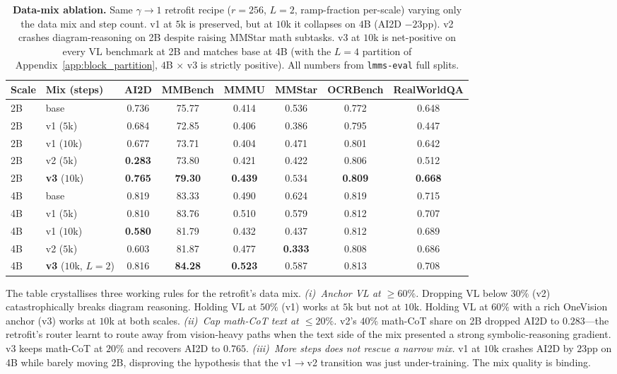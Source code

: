\documentclass{article}
\begin{document}
\begin{table}[h]
\caption{\textbf{Data-mix ablation.} Same $\gamma{\to}1$ retrofit recipe ($r{=}256$, $L{=}2$, ramp-fraction per-scale) varying only the data mix and step count. v1 at $5$k is preserved, but at $10$k it collapses on $4$B (AI2D $-23$pp). v2 crashes diagram-reasoning on 2B despite raising MMStar math subtasks. v3 at $10$k is net-positive on every VL benchmark at 2B and matches base at 4B (with the $L{=}4$ partition of Appendix~\ref{app:block_partition}, $4$B $\times$ v3 is strictly positive). All numbers from \texttt{lmms-eval} full splits.}
\label{tab:data_mix_ablation}
\centering\small
\setlength{\tabcolsep}{4pt}
\begin{tabular}{llcccccc}
\toprule
Scale & Mix (steps) & AI2D & MMBench & MMMU & MMStar & OCRBench & RealWorldQA \\
\midrule
2B & base                  & 0.736 & 75.77 & 0.414 & 0.536 & 0.772 & 0.648 \\
2B & v1 ($5$k)             & 0.684 & 72.85 & 0.406 & 0.386 & 0.795 & 0.447 \\
2B & v1 ($10$k)            & 0.677 & 73.71 & 0.404 & 0.471 & 0.801 & 0.642 \\
2B & v2 ($5$k)             & \textbf{0.283} & 73.80 & 0.421 & 0.422 & 0.806 & 0.512 \\
2B & \textbf{v3} ($10$k)   & \textbf{0.765} & \textbf{79.30} & \textbf{0.439} & $0.534$ & \textbf{0.809} & \textbf{0.668} \\
\midrule
4B & base                  & 0.819 & 83.33 & 0.490 & 0.624 & 0.819 & 0.715 \\
4B & v1 ($5$k)             & 0.810 & 83.76 & 0.510 & 0.579 & 0.812 & 0.707 \\
4B & v1 ($10$k)            & \textbf{0.580} & 81.79 & 0.432 & 0.437 & 0.812 & 0.689 \\
4B & v2 ($5$k)             & 0.603 & 81.87 & 0.477 & \textbf{0.333} & 0.808 & 0.686 \\
4B & \textbf{v3} ($10$k, $L{=}2$) & 0.816 & \textbf{84.28} & \textbf{0.523} & 0.587 & 0.813 & 0.708 \\
\bottomrule
\end{tabular}
\end{table}

The table crystallises three working rules for the retrofit's data mix.
\emph{(i)~Anchor VL at $\geq 60\%$.} Dropping VL below $30\%$ (v2) catastrophically breaks diagram reasoning. Holding VL at $50\%$ (v1) works at $5$k but not at $10$k. Holding VL at $60\%$ with a rich OneVision anchor (v3) works at $10$k at both scales.
\emph{(ii)~Cap math-CoT text at $\leq 20\%$.} v2's $40\%$ math-CoT share on 2B dropped AI2D to $0.283$---the retrofit's router learnt to route away from vision-heavy paths when the text side of the mix presented a strong symbolic-reasoning gradient. v3 keeps math-CoT at $20\%$ and recovers AI2D to $0.765$.
\emph{(iii)~More steps does not rescue a narrow mix.} v1 at $10$k crashes AI2D by $23$pp on 4B while barely moving 2B, disproving the hypothesis that the v1$\to$v2 transition was just under-training. The mix quality is binding.
\end{document}
